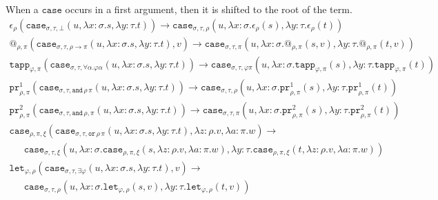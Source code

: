 \documentclass[a4paper,UKenglish,cleveref,autoref,numberwithinsect]{lipics-v2019}
\theoremstyle{definition}
\newcommand{\arrtype}{\rightarrow}
\newcommand{\quant}[2]{\forall #1.#2}
\newcommand{\abs}[2]{\lambda #1.#2}
\newcommand{\red}{\longrightarrow}
\newcommand{\proj}{\mathtt{pr}}
\begin{document}
When a $\mathtt{case}$ occurs in a first argument, then it is shifted
to the root of the term.
\[
\begin{array}{l}
\epsilon_\rho(\mathtt{case}_{\sigma,\tau,\bot}(u,\abs{x:\sigma}{s},
  \abs{y:\tau}{t})) \red
  \mathtt{case}_{\sigma,\tau,\rho}(u,\abs{x:\sigma}{\epsilon_\rho(s)},
  \abs{y:\tau}{\epsilon_\rho(t)}) \\
@_{\rho,\pi}(\mathtt{case}_{\sigma,\tau,\rho \arrtype \pi}(u,
  \abs{x:\sigma}{s},\abs{y:\tau}{t}),v) \red
  \mathtt{case}_{\sigma,\tau,\pi}(u,
  \abs{x:\sigma}{@_{\rho,\pi}(s,v)},\abs{y:\tau}{@_{\rho,\pi}(t,v)}) \\
\mathtt{tapp}_{\varphi,\pi}(\mathtt{case}_{\sigma,\tau,
  \quant{\alpha}{\varphi\alpha}}(u,\abs{x:\sigma}{s},\abs{y:\tau}{t}))
  \red
  \mathtt{case}_{\sigma,\tau,\varphi\pi}(u,
  \abs{x:\sigma}{\mathtt{tapp}_{\varphi,\pi}(s)},
  \abs{y:\tau}{\mathtt{tapp}_{\varphi,\pi}(t)}) \\
\proj^1_{\rho,\pi}(\mathtt{case}_{\sigma,\tau,\mathtt{and}\,\rho\,\pi}(u,
  \abs{x:\sigma}{s},\abs{y:\tau}{t})) \red
  \mathtt{case}_{\sigma,\tau,\rho}(u,\abs{x:\sigma}{\proj^1_{\rho,\pi}(s)},
  \abs{y:\tau}{\proj^1_{\rho,\pi}(t)}) \\
\proj^2_{\rho,\pi}(\mathtt{case}_{\sigma,\tau,\mathtt{and}\,\rho,\pi}(u,
  \abs{x:\sigma}{s},\abs{y:\tau}{t}))\red
  \mathtt{case}_{\sigma,\tau,\pi}(u,\abs{x:\sigma}{\proj^2_{\rho,\pi}(s)},
  \abs{y:\tau}{\proj^2_{\rho,\pi}(t)}) \\
\mathtt{case}_{\rho,\pi,\xi}(\mathtt{case}_{\sigma,\tau,\mathtt{or}\,
  \rho\,\pi}(u,\abs{x:\sigma}{s},\abs{y:\tau}{t}),\abs{z:\rho}{v},
  \abs{a:\pi}{w}) \red \\
\phantom{AB}
  \mathtt{case}_{\sigma,\tau,\xi}(u,\abs{x:\sigma}{
    \mathtt{case}_{\rho,\pi,\xi}(s,\abs{z:\rho}{v},\abs{a:\pi}{w})},
    \abs{y:\tau}{\mathtt{case}_{\rho,\pi,\xi}(t,\abs{z:\rho}{v},
    \abs{a:\pi}{w})}) \\
\mathtt{let}_{\varphi,\rho}(
  \mathtt{case}_{\sigma,\tau,\exists\varphi}(
  u,\abs{x:\sigma}{s},\abs{y:\tau}{t}),v) \red \\
\phantom{AB}
  \mathtt{case}_{\sigma,\tau,\rho}(u,
  \abs{x:\sigma}{\mathtt{let}_{\varphi,\rho}(s,v)},
  \abs{y:\tau}{\mathtt{let}_{\varphi,\rho}(t,v)}) \\
\end{array}
\]
\end{document}
